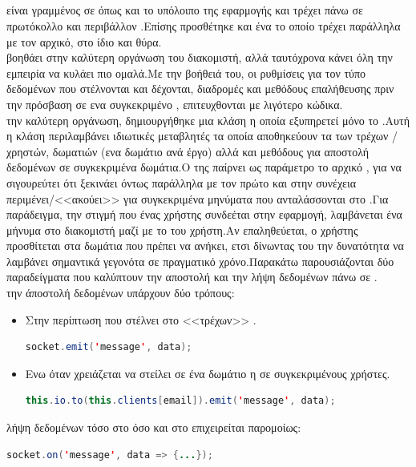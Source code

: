 \subsection{}
  είναι γραμμένος σε  όπως και το υπόλοιπο της εφαρμογής και τρέχει πάνω σε πρωτόκολλο  και περιβάλλον .Επίσης προσθέτηκε και ένα  το οποίο τρέχει παράλληλα με τον αρχικό, στο ίδιο  και θύρα.\\
  βοηθάει στην καλύτερη οργάνωση του διακομιστή, αλλά ταυτόχρονα κάνει όλη την εμπειρία να κυλάει πιο ομαλά.Με την βοήθειά του, οι ρυθμίσεις για τον τύπο δεδομένων που στέλνονται και δέχονται, διαδρομές και μεθόδους επαλήθευσης πριν την πρόσβαση σε ενα συγκεκριμένο , επιτευχθονται με λιγότερο κώδικα.\\
 την καλύτερη οργάνωση, δημιουργήθηκε μια κλάση  η οποία εξυπηρετεί μόνο το .Αυτή η κλάση περιλαμβάνει ιδιωτικές μεταβλητές τα οποία αποθηκεύουν τα  των τρέχων /χρηστών, δωματιών (ενα δωμάτιο ανά έργο) αλλά και μεθόδους για αποστολή δεδομένων σε συγκεκριμένα δωμάτια.Ο  της παίρνει ως παράμετρο το αρχικό , για να σιγουρεύτει ότι ξεκινάει όντως παράλληλα με τον πρώτο και στην συνέχεια περιμένει/<<ακούει>> για συγκεκριμένα μηνύματα που ανταλάσσονται στο .Για παράδειγμα, την στιγμή που ένας χρήστης συνδεέται στην εφαρμογή, λαμβάνεται ένα μήνυμα στο  διακομιστή μαζί με το  του χρήστη.Αν επαληθεύεται, ο χρήστης προσθίτεται στα δωμάτια που πρέπει να ανήκει, ετσι δίνωντας του την δυνατότητα να λαμβάνει σημαντικά γεγονότα σε πραγματικό χρόνο.Παρακάτω παρουσιάζονται δύο παραδείγματα που καλύπτουν την αποστολή και την λήψη δεδομένων πάνω σε .\\
 την άποστολή δεδομένων υπάρχουν δύο τρόπους:
\begin{itemize}
	\item Στην περίπτωση που στέλνει στο <<τρέχων>> .
	\begin{lstlisting}[language=Java]
socket.emit('message', data); 
	\end{lstlisting}
	\item Ενω όταν χρειάζεται να στείλει σε ένα δωμάτιο η σε συγκεκριμένους χρήστες.
	\begin{lstlisting}[language=Java]
this.io.to(this.clients[email]).emit('message', data);
	\end{lstlisting}
\end{itemize}
 λήψη δεδομένων τόσο στο  όσο και στο  επιχειρείται παρομοίως:
	\begin{lstlisting}[language=Java]
	socket.on('message', data => {...});
	\end{lstlisting}

